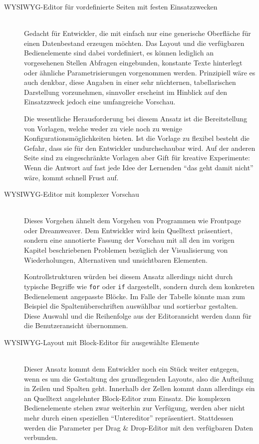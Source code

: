 \begin{description}
\item[ WYSIWYG-Editor für vordefinierte Seiten mit festen Einsatzzwecken] \hfill \\
  Gedacht für Entwickler, die mit \idename{} einfach nur eine generische Oberfläche für einen Datenbestand erzeugen möchten. Das Layout und die verfügbaren Bedienelemente sind dabei vordefiniert, es können lediglich an vorgesehenen Stellen Abfragen eingebunden, konstante Texte hinterlegt oder ähnliche Parametrisierungen vorgenommen werden. Prinzipiell wäre es auch denkbar, diese Angaben in einer sehr nüchternen, tabellarischen Darstellung vorzunehmen, sinnvoller erscheint im Hinblick auf den Einsatzzweck jedoch eine umfangreiche Vorschau.

  Die wesentliche Herausforderung bei diesem Ansatz ist die Bereitstellung von Vorlagen, welche weder zu viele noch zu wenige Konfigurationsmöglichkeiten bieten. Ist die Vorlage zu flexibel besteht die Gefahr, dass sie für den Entwickler undurchschaubar wird. Auf der anderen Seite sind zu eingeschränkte Vorlagen aber Gift für kreative Experimente: Wenn die Antwort auf fast jede Idee der Lernenden "`das geht damit nicht"' wäre, kommt schnell Frust auf.

\item[ WYSIWYG-Editor mit komplexer Vorschau] \hfill \\
  Dieses Vorgehen ähnelt dem Vorgehen von Programmen wie Frontpage oder Dream\-weaver. Dem Entwickler wird kein Quelltext präsentiert, sondern eine annotierte Fassung der Vorschau mit all den im vorigen Kapitel beschriebenen Problemen bezüglich der Visualisierung von Wiederholungen, Alternativen und unsichtbaren Elementen.

  Kontrollstrukturen würden bei diesem Ansatz allerdings nicht durch typische Begriffe wie \texttt{for} oder \texttt{if} dargestellt, sondern durch dem konkreten Bedienelement angepasste Blöcke. Im Falle der Tabelle könnte man zum Beispiel die Spaltenüberschriften auswählbar und sortierbar gestalten. Diese Auswahl und die Reihenfolge aus der Editoransicht werden dann für die Benutzeransicht übernommen.
\item[ WYSIWYG-Layout mit Block-Editor für ausgewählte Elemente] \hfill \\
  Dieser Ansatz kommt dem Entwickler noch ein Stück weiter entgegen, wenn es um die Gestaltung des grundlegenden Layouts, also die Aufteilung in Zeilen und Spalten geht. Innerhalb der Zellen kommt dann allerdings ein an Quelltext angelehnter Block-Editor zum Einsatz. Die komplexen Bedienelemente stehen zwar weiterhin zur Verfügung, werden aber nicht mehr durch einen speziellen "`Untereditor"' repräsentiert. Stattdessen werden die Parameter per Drag \& Drop-Editor mit den verfügbaren Daten verbunden.
  

\end{description}
